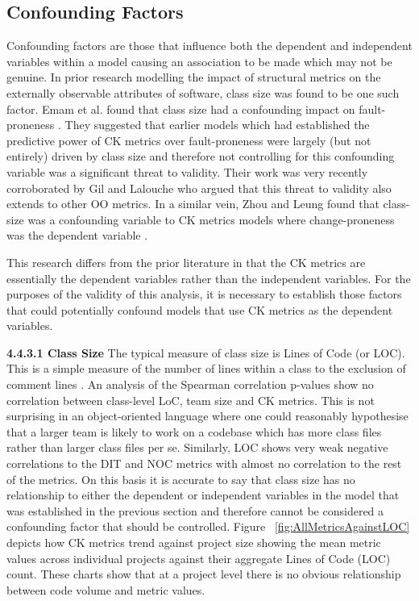 \subsection{Confounding Factors}
Confounding factors are those that influence both the dependent and independent variables within a model causing an association to be made which may not be genuine. In prior research modelling the impact of structural metrics on the externally observable attributes of software, class size was found to be one such factor. Emam et al. found that class size had a confounding impact on fault-proneness \citep{el2001prediction}. They suggested that earlier models which had established the predictive power of CK metrics over fault-proneness were largely (but not entirely) driven by class size and therefore not controlling for this confounding variable was a significant threat to validity. Their work was very recently corroborated by Gil and Lalouche \citep{gil2017correlation} who argued that this threat to validity also extends to other OO metrics. In a similar vein, Zhou and Leung found that class-size was a confounding variable to CK metrics models where change-proneness was the dependent variable \citep{zhou2006empirical}.

This research differs from the prior literature in that the CK metrics are essentially the dependent variables rather than the independent variables. For the purposes of the validity of this analysis, it is necessary to establish those factors that could potentially confound models that use CK metrics as the dependent variables.

\newline
\textbf{4.4.3.1 Class Size}
\newline
The typical measure of class size is  Lines of Code (or LOC). This is a simple measure of the number of lines within a class to the exclusion of comment lines \citep{nguyen2007sloc}. An analysis of the Spearman correlation p-values show no correlation between class-level LoC, team size and CK metrics. This is not surprising in an object-oriented language where one could reasonably hypothesise that a larger team is likely to work on a codebase which has more class files rather than larger class files per se. Similarly, LOC shows very weak negative correlations to the DIT and NOC metrics with almost no correlation to the rest of the metrics. On this basis it is accurate to say that class size has no relationship to either the dependent or independent variables in the model that was established in the previous section and therefore cannot be considered a confounding factor that should be controlled. Figure ~\ref{fig:AllMetricsAgainstLOC}  depicts how CK metrics trend against project size showing the mean metric values across individual projects against their aggregate Lines of Code (LOC) count. These charts show that at a project level there is no obvious relationship between code volume and metric values.

